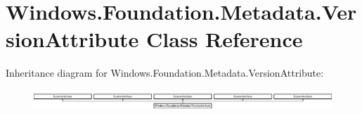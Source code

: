 \hypertarget{class_windows_1_1_foundation_1_1_metadata_1_1_version_attribute}{}\section{Windows.\+Foundation.\+Metadata.\+Version\+Attribute Class Reference}
\label{class_windows_1_1_foundation_1_1_metadata_1_1_version_attribute}
Inheritance diagram for Windows.\+Foundation.\+Metadata.\+Version\+Attribute\+:\begin{figure}[H]
\begin{center}
\leavevmode
\includegraphics[height=0.777778cm]{class_windows_1_1_foundation_1_1_metadata_1_1_version_attribute}
\end{center}
\end{figure}
